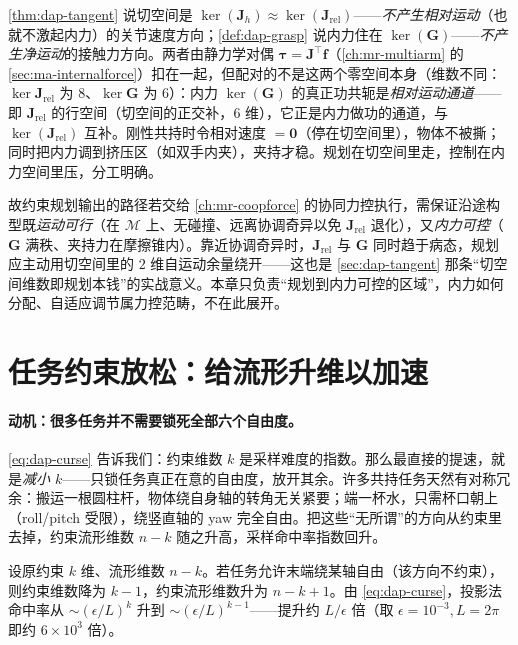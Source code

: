 \begin{insight}
\cref{thm:dap-tangent} 说切空间是 $\ker(\mathbf{J}_h)\!\approx\!\ker(\mathbf{J}_{\text{rel}})$——\emph{不产生相对运动}（也就不激起内力）的关节速度方向；\cref{def:dap-grasp} 说内力住在 $\ker(\mathbf{G})$——\emph{不产生净运动}的接触力方向。两者由静力学对偶 $\boldsymbol{\tau}=\mathbf{J}^\top\mathbf{f}$（\cref{ch:mr-multiarm} 的 \cref{sec:ma-internalforce}）扣在一起，但配对的不是这两个零空间本身（维数不同：$\ker\mathbf{J}_{\text{rel}}$ 为 $8$、$\ker\mathbf{G}$ 为 $6$）：内力 $\ker(\mathbf{G})$ 的真正功共轭是\emph{相对运动通道}——即 $\mathbf{J}_{\text{rel}}$ 的行空间（切空间的正交补，$6$ 维），它正是内力做功的通道，与 $\ker(\mathbf{J}_{\text{rel}})$ 互补。刚性共持时令相对速度 $=\mathbf{0}$（停在切空间里），物体不被撕；同时把内力调到挤压区（如双手内夹），夹持才稳。规划在切空间里走，控制在内力空间里压，分工明确。
\end{insight}

故约束规划输出的路径若交给 \cref{ch:mr-coopforce} 的协同力控执行，需保证沿途构型既\emph{运动可行}（在 $\mathcal{M}$ 上、无碰撞、远离协调奇异以免 $\mathbf{J}_{\text{rel}}$ 退化），又\emph{内力可控}（$\mathbf{G}$ 满秩、夹持力在摩擦锥内）。靠近协调奇异时，$\mathbf{J}_{\text{rel}}$ 与 $\mathbf{G}$ 同时趋于病态，规划应主动用切空间里的 $2$ 维自运动余量绕开——这也是 \cref{sec:dap-tangent} 那条“切空间维数即规划本钱”的实战意义。本章只负责“规划到内力可控的区域”，内力如何分配、自适应调节属力控范畴，不在此展开。

\section{任务约束放松：给流形升维以加速}
\label{sec:dap-relax}

\paragraph{动机：很多任务并不需要锁死全部六个自由度。}
\cref{eq:dap-curse} 告诉我们：约束维数 $k$ 是采样难度的指数。那么最直接的提速，就是\emph{减小 $k$}——只锁任务真正在意的自由度，放开其余。许多共持任务天然有对称冗余：搬运一根圆柱杆，物体绕自身轴的转角无关紧要；端一杯水，只需杯口朝上（roll/pitch 受限），绕竖直轴的 yaw 完全自由。把这些“无所谓”的方向从约束里去掉，约束流形维数 $n-k$ 随之升高，采样命中率指数回升。

\begin{proposition}\label{prop:dap-relax}
设原约束 $k$ 维、流形维数 $n-k$。若任务允许末端绕某轴自由（该方向不约束），则约束维数降为 $k-1$，约束流形维数升为 $n-k+1$。由 \cref{eq:dap-curse}，投影法命中率从 $\sim(\epsilon/L)^{k}$ 升到 $\sim(\epsilon/L)^{k-1}$——提升约 $L/\epsilon$ 倍（取 $\epsilon=10^{-3},L=2\pi$ 即约 $6\times10^3$ 倍）。
\end{proposition}

